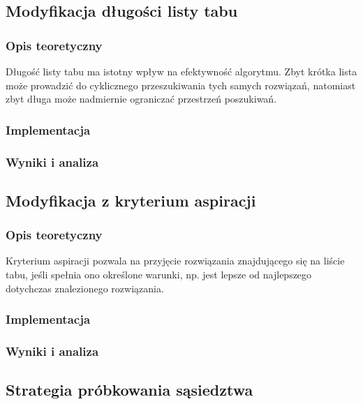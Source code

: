 \documentclass[12pt,a4paper]{article}
\begin{document}
\subsection{Modyfikacja długości listy tabu}
\subsubsection{Opis teoretyczny}
Długość listy tabu ma istotny wpływ na efektywność algorytmu. Zbyt krótka lista może prowadzić do cyklicznego przeszukiwania tych samych rozwiązań, natomiast zbyt długa może nadmiernie ograniczać przestrzeń poszukiwań.

\subsubsection{Implementacja}

\subsubsection{Wyniki i analiza}

\subsection{Modyfikacja z kryterium aspiracji}
\subsubsection{Opis teoretyczny}
Kryterium aspiracji pozwala na przyjęcie rozwiązania znajdującego się na liście tabu, jeśli spełnia ono określone warunki, np. jest lepsze od najlepszego dotychczas znalezionego rozwiązania.

\subsubsection{Implementacja}

\subsubsection{Wyniki i analiza}

\subsection{Strategia próbkowania sąsiedztwa}
\end{document}
